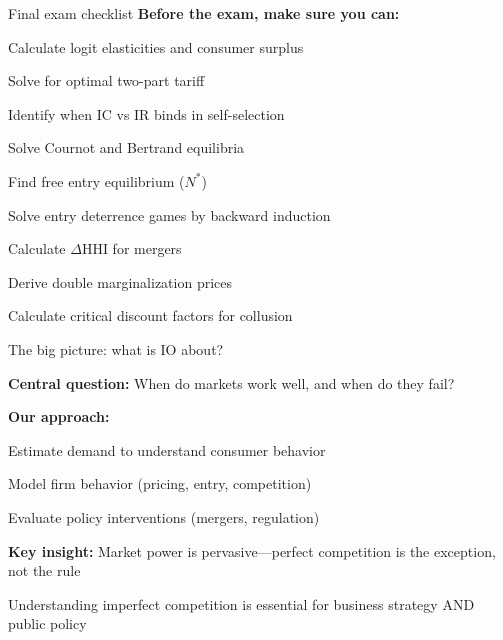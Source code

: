 \documentclass[notes,11pt, aspectratio=169]{beamer}
\newenvironment{wideitemize}{\itemize\addtolength{\itemsep}{10pt}}{\enditemize}
\begin{document}
\begin{frame}{Final exam checklist}
	\textbf{Before the exam, make sure you can:}
	\vspace{5pt}
	\begin{wideitemize}
		\item[$\square$] Calculate logit elasticities and consumer surplus
		\item[$\square$] Solve for optimal two-part tariff
		\item[$\square$] Identify when IC vs IR binds in self-selection
		\item[$\square$] Solve Cournot and Bertrand equilibria
		\item[$\square$] Find free entry equilibrium ($N^*$)
		\item[$\square$] Solve entry deterrence games by backward induction
		\item[$\square$] Calculate $\Delta$HHI for mergers
		\item[$\square$] Derive double marginalization prices
		\item[$\square$] Calculate critical discount factors for collusion
	\end{wideitemize}
\end{frame}


\begin{frame}{The big picture: what is IO about?}
	\begin{wideitemize}
		\item \textbf{Central question:} When do markets work well, and when do they fail?
		\item \textbf{Our approach:}
		\begin{wideitemize}
			\vspace{5pt}
			\item Estimate demand to understand consumer behavior
			\item Model firm behavior (pricing, entry, competition)
			\item Evaluate policy interventions (mergers, regulation)
		\end{wideitemize}
		\item \textbf{Key insight:} Market power is pervasive---perfect competition is the exception, not the rule
		\item Understanding imperfect competition is essential for business strategy AND public policy
	\end{wideitemize}
\end{frame}
\end{document}
